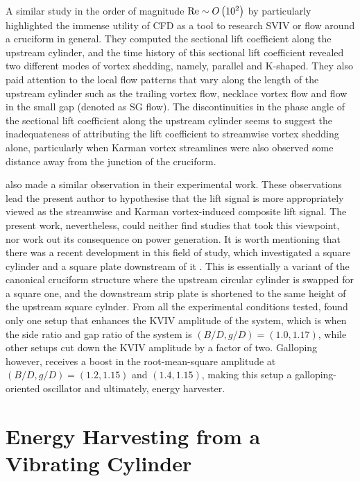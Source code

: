 \documentclass[oneside]{utmthesis}
\begin{document}
A similar study in the order of magnitude $\text{Re} \sim O \left( 10^{2} \right)$ by \citet{Zhao2018a} particularly highlighted the immense utility of CFD as a tool to research SVIV or flow around a cruciform in general. They computed the sectional lift coefficient along the upstream cylinder, and the time history of this sectional lift coefficient revealed two different modes of vortex shedding, namely, parallel and K-shaped. They also paid attention to the local flow patterns that vary along the length of the upstream cylinder such as the trailing vortex flow, necklace vortex flow and flow in the small gap (denoted as SG flow). The discontinuities in the phase angle of the sectional lift coefficient along the upstream cylinder seems to suggest the inadequateness of attributing the lift coefficient to streamwise vortex shedding alone, particularly when Karman vortex streamlines were also observed some distance away from the junction of the cruciform.

\citet{Shirakashi1989} also made a similar observation in their experimental work. These observations lead the present author to hypothesise that the lift signal is more appropriately viewed as the streamwise and Karman vortex-induced composite lift signal. The present work, nevertheless, could neither find studies that took this viewpoint, nor work out its consequence on power generation. It is worth mentioning that there was a recent development in this field of study, which investigated a square cylinder and a square plate downstream of it \citep{Mohamed2021}. This is essentially a variant of the canonical cruciform structure where the upstream circular cylinder is swapped for a square one, and the downstream strip plate is shortened to the same height of the upstream square cylnder. From all the experimental conditions tested, \citet{Mohamed2021} found only one setup that enhances the KVIV amplitude of the system, which is when the side ratio and gap ratio of the system is $(B/D, g/D) = (1.0, 1.17)$, while other setups cut down the KVIV amplitude by a factor of two. Galloping however, receives a boost in the root-mean-square amplitude at $(B/D, g/D) = (1.2, 1.15)$ and $(1.4, 1.15)$, making this setup a galloping-oriented oscillator and ultimately, energy harvester.

\section{Energy Harvesting from a Vibrating Cylinder} \label{sec:energyHarvesting}
\end{document}
